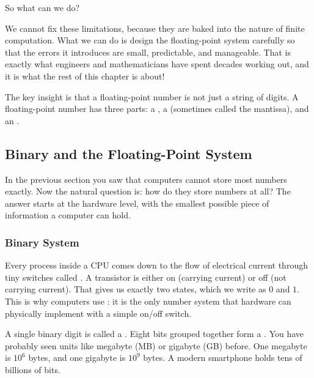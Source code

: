 So what can we do?

We cannot fix these limitations, because they are baked into the nature of finite computation.
What we can do is design the floating-point system carefully so that the errors it introduces are small, predictable, and manageable. That is exactly what engineers and mathematicians have spent decades working out, and it is what the rest of this chapter is about!

The key insight is that a floating-point number is not just a string of digits. A floating-point number has three parts: a , a 
(sometimes called the mantissa), and an .


\subsection{Binary and the Floating-Point System}

In the previous section you saw that computers cannot store most numbers
exactly.
Now the natural question is: how do they store numbers at all?
The answer starts at the hardware level, with the smallest possible piece of
information a computer can hold.

\subsubsection{Binary System}

Every process inside a CPU comes down to the flow of electrical current through
tiny switches called .
A transistor is either on (carrying current) or off (not carrying current).
That gives us exactly two states, which we write as $0$ and $1$.
This is why computers use : it is the only number
system that hardware can physically implement with a simple on/off switch.

A single binary digit is called a .
Eight bits grouped together form a .
You have probably seen units like megabyte (MB) or gigabyte (GB) before.
One megabyte is $10^6$ bytes, and one gigabyte is $10^9$ bytes.
A modern smartphone holds tens of billions of bits.

